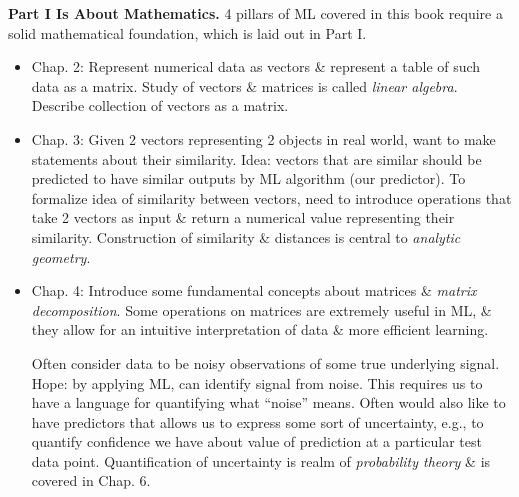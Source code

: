 \documentclass{article}
\begin{document}
\begin{enumerate}
\begin{itemize}
\begin{itemize}
			{\bf Part I Is About Mathematics.} 4 pillars of ML covered in this book require a solid mathematical foundation, which is laid out in Part I.
			\begin{itemize}
				\item Chap. 2: Represent numerical data as vectors \& represent a table of such data as a matrix. Study of vectors \& matrices is called {\it linear algebra}. Describe collection of vectors as a matrix.
				\item Chap. 3: Given 2 vectors representing 2 objects in real world, want to make statements about their similarity. Idea: vectors that are similar should be predicted to have similar outputs by ML algorithm (our predictor). To formalize idea of similarity between vectors, need to introduce operations that take 2 vectors as input \& return a numerical value representing their similarity. Construction of similarity \& distances is central to {\it analytic geometry}.
				\item Chap. 4: Introduce some fundamental concepts about matrices \& {\it matrix decomposition}. Some operations on matrices are extremely useful in ML, \& they allow for an intuitive interpretation of data \& more efficient learning.
				
				Often consider data to be noisy observations of some true underlying signal. Hope: by applying ML, can identify signal from noise. This requires us to have a language for quantifying what ``noise'' means. Often would also like to have predictors that allows us to express some sort of uncertainty, e.g., to quantify confidence we have about value of prediction at a particular test data point. Quantification of uncertainty is realm of {\it probability theory} \& is covered in Chap. 6.
				

\end{itemize}
\end{itemize}
\end{itemize}
\end{enumerate}
\end{document}
